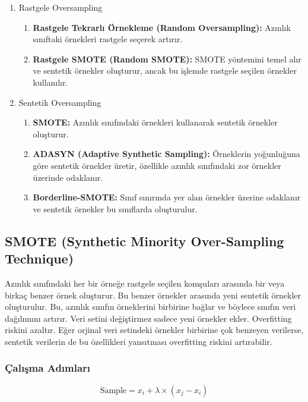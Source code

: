 \begin{enumerate}
    \item Rastgele Oversampling
    \begin{enumerate}
        \item \textbf{Rastgele Tekrarlı Örnekleme (Random Oversampling):} Azınlık sınıftaki örnekleri rastgele seçerek artırır.
        \item \textbf{Rastgele SMOTE (Random SMOTE):} SMOTE yöntemini temel alır ve sentetik örnekler oluşturur, ancak bu işlemde rastgele seçilen örnekler kullanılır.
    \end{enumerate}
    \item Sentetik Oversampling
    \begin{enumerate}
        \item \textbf{SMOTE:} Azınlık sınıfındaki örnekleri kullanarak sentetik örnekler oluşturur.
        \item \textbf{ADASYN (Adaptive Synthetic Sampling):} Örneklerin yoğunluğuna göre sentetik örnekler üretir, özellikle azınlık sınıfındaki zor örnekler üzerinde odaklanır.
        \item \textbf{Borderline-SMOTE:} Sınıf sınırında yer alan örnekler üzerine odaklanır ve sentetik örnekler bu sınıflarda oluşturulur.
    \end{enumerate}
\end{enumerate}

\newpage

\subsection{SMOTE (Synthetic Minority Over-Sampling Technique)}
Azınlık sınıfındaki her bir örneğe rastgele seçilen komşuları arasında bir veya birkaç benzer örnek oluşturur. Bu benzer örnekler arasında yeni sentetik örnekler oluşturulur. Bu, azınlık sınıfın örneklerini birbirine bağlar ve böylece sınıfın veri dağılımını artırır. Veri setini değiştirmez sadece yeni örnekler ekler. Overfitting riskini azaltır. Eğer orjinal veri setindeki örnekler birbirine çok benzeyen verilerse, sentetik verilerin de bu özellikleri yansıtması overfitting riskini artırabilir.

\subsubsection{Çalışma Adımları}

\[ \text{Sample} = x_i + \lambda \times (x_j - x_i) \]

